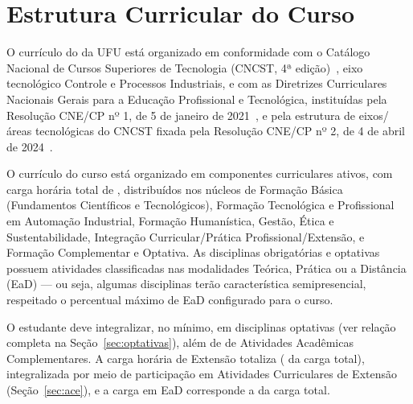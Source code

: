 \chapter{Estrutura Curricular do Curso}
\label{chp:estrutura_curricular}

O currículo do \ppccurso da UFU está organizado em conformidade com o Catálogo Nacional de Cursos Superiores de Tecnologia (CNCST, 4ª edição)~\cite{mec_cncst_2024}, eixo tecnológico Controle e Processos Industriais, e com as Diretrizes Curriculares Nacionais Gerais para a Educação Profissional e Tecnológica, instituídas pela Resolução CNE/CP nº 1, de 5 de janeiro de 2021~\cite{cne_cp_1_2021}, e pela estrutura de eixos/áreas tecnológicas do CNCST fixada pela Resolução CNE/CP nº 2, de 4 de abril de 2024~\cite{cne_cp_2_2024}.

O currículo do curso está organizado em  componentes curriculares ativos, com carga horária total de \textbf{}, distribuídos nos núcleos de Formação Básica (Fundamentos Científicos e Tecnológicos), Formação Tecnológica e Profissional em Automação Industrial, Formação Humanística, Gestão, Ética e Sustentabilidade, Integração Curricular/Prática Profissional/Extensão, e Formação Complementar e Optativa. As disciplinas obrigatórias e optativas possuem atividades classificadas nas modalidades Teórica, Prática ou a Distância (EaD) — ou seja, algumas disciplinas terão característica semipresencial, respeitado o percentual máximo de EaD configurado para o curso.

O estudante deve integralizar, no mínimo, \textbf{} em disciplinas optativas (ver relação completa na Seção~\ref{sec:optativas}), além de \textbf{} de Atividades Acadêmicas Complementares. A carga horária de Extensão totaliza \textbf{} ( da carga total), integralizada por meio de participação em Atividades Curriculares de Extensão (Seção~\ref{sec:ace}), e a carga em EaD corresponde a  da carga total.

